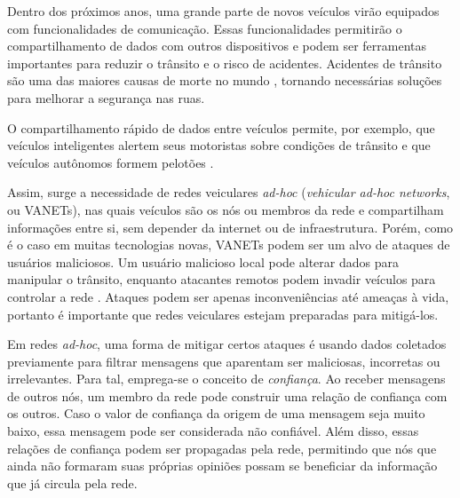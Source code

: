 \begin{resumoextendido}
%	
%	
	
	Dentro dos próximos anos, uma grande parte de novos veículos virão equipados com funcionalidades de comunicação.
	Essas funcionalidades permitirão o compartilhamento de dados com outros dispositivos e podem ser ferramentas importantes para reduzir o trânsito e o risco de acidentes.
	Acidentes de trânsito são uma das maiores causas de morte no mundo \citep{whofactsheet}, tornando necessárias soluções para melhorar a segurança nas ruas.
	
	O compartilhamento rápido de dados entre veículos permite, por exemplo, que veículos inteligentes alertem seus motoristas sobre condições de trânsito \citep{lee2004collision} e que veículos autônomos formem pelotões \citep{amoozadeh2015platoon}.
	
	Assim, surge a necessidade de redes veiculares \textit{ad-hoc} (\textit{vehicular ad-hoc networks}, ou VANETs), nas quais veículos são os nós ou membros da rede e compartilham informações entre si, sem depender da internet ou de infraestrutura.	
	Porém, como é o caso em muitas tecnologias novas, VANETs podem ser um alvo de ataques de usuários maliciosos.
	Um usuário malicioso local pode alterar dados para manipular o trânsito, enquanto atacantes remotos podem invadir veículos para controlar a rede \citep{garip2015congestion}.
	Ataques podem ser apenas inconveniências até ameaças à vida, portanto é importante que redes veiculares estejam preparadas para mitigá-los.

	Em redes \textit{ad-hoc}, uma forma de mitigar certos ataques é usando dados coletados previamente para filtrar mensagens que aparentam ser maliciosas, incorretas ou irrelevantes.
	Para tal, emprega-se o conceito de \textit{confiança}.
	Ao receber mensagens de outros nós, um membro da rede pode construir uma relação de confiança com os outros.	
	Caso o valor de confiança da origem de uma mensagem seja muito baixo, essa mensagem pode ser considerada não confiável.
	Além disso, essas relações de confiança podem ser propagadas pela rede, permitindo que nós que ainda não formaram suas próprias opiniões possam se beneficiar da informação que já circula pela rede.
	

\end{resumoextendido}
